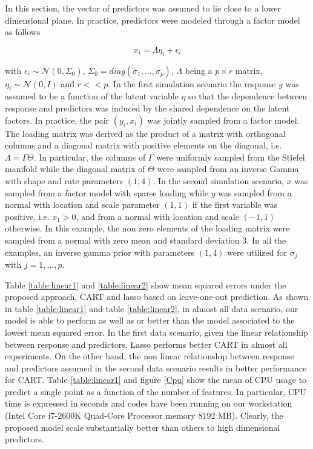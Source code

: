 \documentclass{article} %
\providecommand{\mc}[1]{\mathcal{#1}}
\begin{document}
In this section, the vector of predictors was assumed to lie close to a lower dimensional plane. In practice,  predictors were modeled through a factor model as follows 

\begin{equation} x_i=\Lambda \eta_i + \epsilon_i \end{equation} 

with $\epsilon_i \sim \mc{N}(0,\Sigma_0)$, $\Sigma_0=diag(\sigma_1, \ldots, \sigma_p)$, $\Lambda$ being a $p \times r$ matrix, $\eta_i \sim \mc{N}(0,I)$ and $r<<p$. In the first simulation scenario the response $y$ was assumed to be a function of the latent variable $\eta$ so that  the dependence between response and predictors was induced by the shared dependence on the latent factors. In practice, the pair $(y_i, x_i)$ was jointly sampled from a factor model. The loading matrix was derived as the product of a matrix with orthogonal columns and a diagonal matrix with positive elements on the diagonal, i.e. $\Lambda=\Gamma \Theta$. In particular, the columns of $\Gamma$ were uniformly sampled from the Stiefel manifold while the diagonal matrix of $\Theta$ were sampled from an inverse Gamma with shape and rate parameters $(1,4)$. In the second simulation scenario, $x$ was sampled from a factor model with sparse loading while $y$ was sampled from a normal with location and scale parameter $(1,1)$ if the first variable was positive, i.e. $x_1>0$, and from a normal with location and scale $(-1,1)$ otherwise.  In this example, the non zero elements of the loading matrix were sampled from a normal with zero mean and standard deviation $3$. In all the examples, an inverse gamma prior with parameters $(1,4)$ were utilized for $\sigma_j$ with $j=1, \ldots, p$.

Table \ref{table:linear1} and \ref{table:linear2} show mean squared errors under the proposed approach, CART and lasso based on leave-one-out prediction. As shown in table \ref{table:linear1} and table \ref{table:linear2}, in almost all data scenario, our model is able to perform as well as or better than the model associated to the lowest mean squared error. In the first data scenario, given the linear relationship between response and predictors, Lasso performs better CART in almost all experiments. On the other hand, the non linear relationship between response and predictors assumed in the second data scenario results in better performance for CART. Table \ref{table:linear1} and figure \ref{Cpu} show the mean of CPU usage to predict a single point as a function of the number of features. In particular, CPU time is expressed in seconds and codes have been running on our workstation (Intel Core i7-2600K Quad-Core Processor memory 8192 MB).  Clearly, the proposed model scale substantially better than others to high dimensional predictors. 
\end{document}
